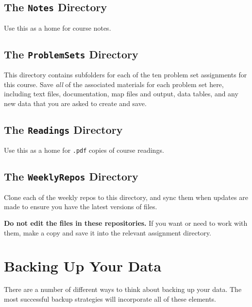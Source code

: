 \documentclass[]{book}
\begin{document}
\subsection{\texorpdfstring{The \texttt{Notes}
Directory}{The Notes Directory}}\label{the-notes-directory}

Use this as a home for course notes.

\subsection{\texorpdfstring{The \texttt{ProblemSets}
Directory}{The ProblemSets Directory}}\label{the-problemsets-directory}

This directory contains subfolders for each of the ten problem set
assignments for this course. Save \emph{all} of the associated materials
for each problem set here, including text files, documentation, map
files and output, data tables, and any new data that you are asked to
create and save.

\subsection{\texorpdfstring{The \texttt{Readings}
Directory}{The Readings Directory}}\label{the-readings-directory}

Use this as a home for \texttt{.pdf} copies of course readings.

\subsection{\texorpdfstring{The \texttt{WeeklyRepos}
Directory}{The WeeklyRepos Directory}}\label{the-weeklyrepos-directory}

Clone each of the weekly repos to this directory, and sync them when
updates are made to ensure you have the latest versions of files.

\textbf{Do not edit the files in these repositories.} If you want or
need to work with them, make a copy and save it into the relevant
assignment directory.

\section{Backing Up Your Data}\label{backing-up-your-data}

There are a number of different ways to think about backing up your
data. The most successful backup strategies will incorporate all of
these elements.
\end{document}
